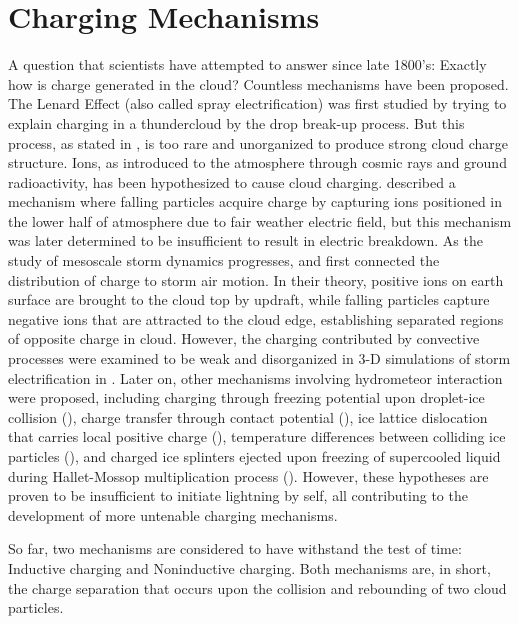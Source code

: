 \section{Charging Mechanisms}
A question that scientists have attempted to answer since late 1800's: Exactly how is charge generated in the cloud? Countless mechanisms have been proposed. The Lenard Effect (also called spray electrification) was first studied by \cite{lenard1892berdie} trying to explain charging in a thundercloud by the drop break-up process. But this process, as stated in \cite{saunders2008charge}, is too rare and unorganized to produce strong cloud charge structure. Ions, as introduced to the  atmosphere through cosmic rays and  ground radioactivity, has been hypothesized to cause cloud charging. \cite{wilson1929some} described a mechanism where falling particles acquire charge by capturing ions positioned in the lower half of atmosphere due to fair weather electric field, but this mechanism was later determined to be insufficient to result in electric breakdown. As the study of mesoscale storm dynamics progresses, \cite{grenet1947essai} and \cite{vonnegut1953possible} first connected the distribution of charge to storm air motion. In their theory, positive ions on earth surface are brought to the cloud top by updraft, while falling particles capture negative ions that are attracted to the cloud edge, establishing separated regions of opposite charge in cloud. However, the charging contributed by convective processes were examined to be weak and disorganized in 3-D simulations of storm electrification in \cite{helsdon2002examination}. Later on, other  mechanisms involving hydrometeor interaction were proposed, including charging through freezing potential upon droplet-ice collision (\cite{workman1950electrical}), charge transfer through contact potential (\cite{caranti1980surface}), ice lattice dislocation that carries local positive charge (\cite{keith1990further}), temperature differences between colliding ice particles (\cite{latham1961generation}), and charged ice splinters ejected upon freezing of supercooled liquid during Hallet-Mossop multiplication process (\cite{hallett1979charge}). However, these hypotheses are proven to be insufficient to initiate lightning by self, all contributing to the development of more untenable charging mechanisms.

So far, two mechanisms are considered to have withstand the test of time: Inductive charging and Noninductive charging. Both mechanisms are, in short, the charge separation that occurs upon the collision and rebounding of two cloud particles. 

